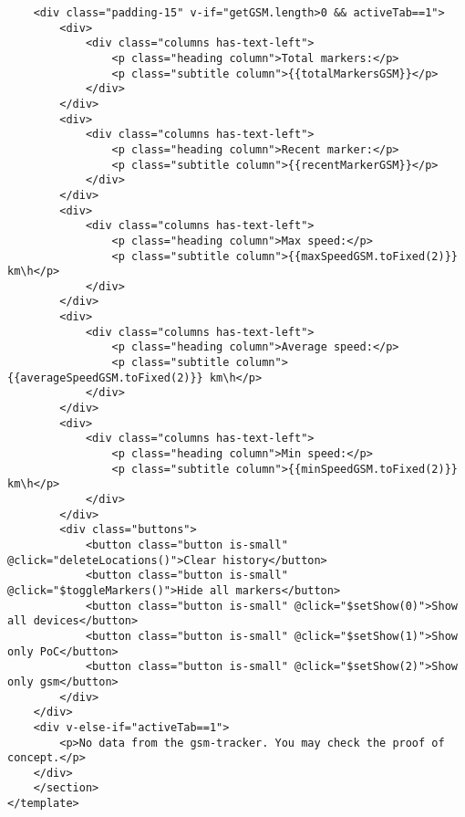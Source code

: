 \begin{lstlisting}
	<div class="padding-15" v-if="getGSM.length>0 && activeTab==1">
		<div>
			<div class="columns has-text-left">
				<p class="heading column">Total markers:</p>
				<p class="subtitle column">{{totalMarkersGSM}}</p>
			</div>
		</div>
		<div>
			<div class="columns has-text-left">
				<p class="heading column">Recent marker:</p>
				<p class="subtitle column">{{recentMarkerGSM}}</p>
			</div>
		</div>
		<div>
			<div class="columns has-text-left">
				<p class="heading column">Max speed:</p>
				<p class="subtitle column">{{maxSpeedGSM.toFixed(2)}} km\h</p>
			</div>
		</div>
		<div>
			<div class="columns has-text-left">
				<p class="heading column">Average speed:</p>
				<p class="subtitle column">{{averageSpeedGSM.toFixed(2)}} km\h</p>
			</div>
		</div>
		<div>
			<div class="columns has-text-left">
				<p class="heading column">Min speed:</p>
				<p class="subtitle column">{{minSpeedGSM.toFixed(2)}} km\h</p>
			</div>
		</div>
		<div class="buttons">
			<button class="button is-small" @click="deleteLocations()">Clear history</button>
			<button class="button is-small" @click="$toggleMarkers()">Hide all markers</button>
			<button class="button is-small" @click="$setShow(0)">Show all devices</button>
			<button class="button is-small" @click="$setShow(1)">Show only PoC</button>
			<button class="button is-small" @click="$setShow(2)">Show only gsm</button>
		</div>
	</div>
	<div v-else-if="activeTab==1">
		<p>No data from the gsm-tracker. You may check the proof of concept.</p>
	</div>
	</section>
</template>


\end{lstlisting}
